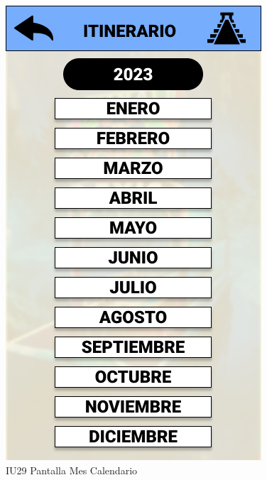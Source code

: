 \begin{figure}[htb]
    \centering 
        \includegraphics[width=.5\linewidth]{Pantallas Prototipo3/IU29 Pantalla Mes Calendario.jpg}
        \caption{IU29 Pantalla Mes Calendario}
\end{figure}

